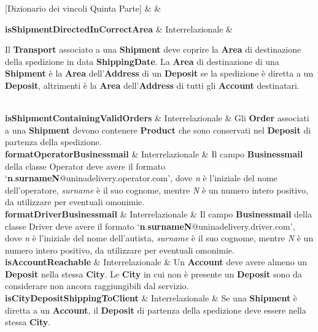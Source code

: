[Dizionario dei vincoli Quinta Parte]{ &  & }{

  \textbf{isShipmentDirectedInCorrectArea} & Interrelazionale &
  {\footnotesize

  Il \textbf{Transport} associato a una \textbf{Shipment} deve coprire la \textbf{Area} di destinazione della spedizione in data \textbf{ShippingDate}.
  La \textbf{Area} di destinazione di una \textbf{Shipment} è la \textbf{Area} dell'\textbf{Address} di un \textbf{Deposit} se la spedizione è diretta a un \textbf{Deposit}, altrimenti è la \textbf{Area} dell'\textbf{Address} di tutti gli \textbf{Account} destinatari.
  
  }\\

  \textbf{isShipmentContainingValidOrders} & Interrelazionale &
  {\footnotesize 
  Gli \textbf{Order} associati a una \textbf{Shipment} devono contenere \textbf{Product} che sono conservati nel \textbf{Deposit} di partenza della spedizione.
  }\\

  \textbf{formatOperatorBusinessmail} & Interrelazionale &
  {\footnotesize
  Il campo \textbf{Businessmail} della classe Operator deve avere il formato `\textbf{n}.\textbf{surnameN}@uninadelivery.operator.com', dove \textit{n} è l'iniziale del nome dell'operatore, \textit{surname} è il suo cognome, mentre \textit{N} è un numero intero positivo, da utilizzare per eventuali omonimie.
  }\\
  
  \textbf{formatDriverBusinessmail} & Interrelazionale &
  {\footnotesize
  Il campo \textbf{Businessmail} della classe Driver deve avere il formato `\textbf{n}.\textbf{surnameN}@uninadelivery.driver.com', dove \textit{n} è l'iniziale del nome dell'autista, \textit{surname} è il suo cognome, mentre \textit{N} è un numero intero positivo, da utilizzare per eventuali omonimie.
  }\\

  \textbf{isAccountReachable} & Interrelazionale &
  {\footnotesize
  Un \textbf{Account} deve avere almeno un \textbf{Deposit} nella stessa \textbf{City}. Le \textbf{City} in cui non è presente un \textbf{Deposit} sono da considerare non ancora raggiungibili dal servizio.
  }\\

  \textbf{isCityDepositShippingToClient} & Interrelazionale &
  {\footnotesize
  Se una \textbf{Shipment} è diretta a un \textbf{Account}, il \textbf{Deposit} di partenza della spedizione deve essere nella stessa \textbf{City}.
  }\\

}

